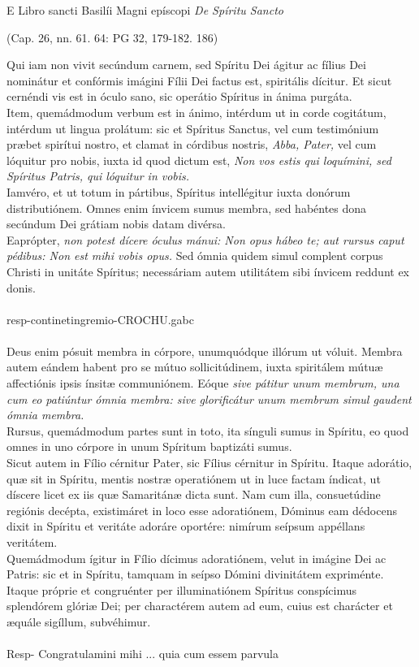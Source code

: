 \documentclass[options]{article}
\begin{document}
	E Libro sancti Basilíi Magni epíscopi \emph{De Spíritu Sancto}
	\begin{flushright}
(Cap. 26, nn. 61. 64: PG 32, 179-182. 186)	
	\end{flushright}
Qui iam non vivit secúndum carnem, sed Spíritu Dei ágitur ac fílius Dei nominátur et confórmis imágini Fílii Dei factus est, spiritális dícitur. Et sicut cernéndi vis est in óculo sano, sic operátio Spíritus in ánima purgáta.\\
Item, quemádmodum verbum est in ánimo, intérdum ut in corde cogitátum, intérdum ut lingua prolátum: sic et Spíritus Sanctus, vel cum testimónium præbet spirítui nostro, et clamat in córdibus nostris, \emph{Abba, Pater,} vel cum lóquitur pro nobis, iuxta id quod dictum est, \emph{Non vos estis qui loquímini, sed Spíritus Patris, qui lóquitur in vobis.}\\
Iamvéro, et ut totum in pártibus, Spíritus intellégitur iuxta donórum distributiónem. Omnes enim ínvicem sumus membra, sed habéntes dona secúndum Dei grátiam nobis datam divérsa.\\
Eaprópter, \emph{non potest dícere óculus mánui: Non opus hábeo te; aut rursus caput pédibus: Non est mihi vobis opus.} Sed ómnia quidem simul complent corpus Christi in unitáte Spíritus; necessáriam autem utilitátem sibi ínvicem reddunt ex donis.\\
\\
 resp-continetingremio-CROCHU.gabc\\
 \\
Deus enim pósuit membra in córpore, unumquódque illórum ut vóluit. Membra autem eándem habent pro se mútuo sollicitúdinem, iuxta spiritálem mútuæ affectiónis ipsis ínsitæ communiónem. Eóque \emph{sive pátitur unum membrum, una cum eo patiúntur ómnia membra: sive glorificátur unum membrum simul gaudent ómnia membra.}\\
Rursus, quemádmodum partes sunt in toto, ita sínguli sumus in Spíritu, eo quod omnes in uno córpore in unum Spíritum baptizáti sumus.\\
Sicut autem in Fílio cérnitur Pater, sic Fílius cérnitur in Spíritu. Itaque adorátio, quæ sit in Spíritu, mentis nostræ operatiónem ut in luce factam índicat, ut díscere licet ex iis quæ Samaritánæ dicta sunt. Nam cum illa, consuetúdine regiónis decépta, existimáret in loco esse adoratiónem, Dóminus eam dédocens dixit in Spíritu et veritáte adoráre oportére: nimírum seípsum appéllans veritátem.\\
Quemádmodum ígitur in Fílio dícimus adoratiónem, velut in imágine Dei ac Patris: sic et in Spíritu, tamquam in seípso Dómini divinitátem expriménte.\\
Itaque próprie et congruénter per illuminatiónem Spíritus conspícimus splendórem glóriæ Dei; per charactérem autem ad eum, cuius est charácter et æquále sigíllum, subvéhimur.\\
\\
Resp- Congratulamini mihi ... quia cum essem parvula
\end{document}
